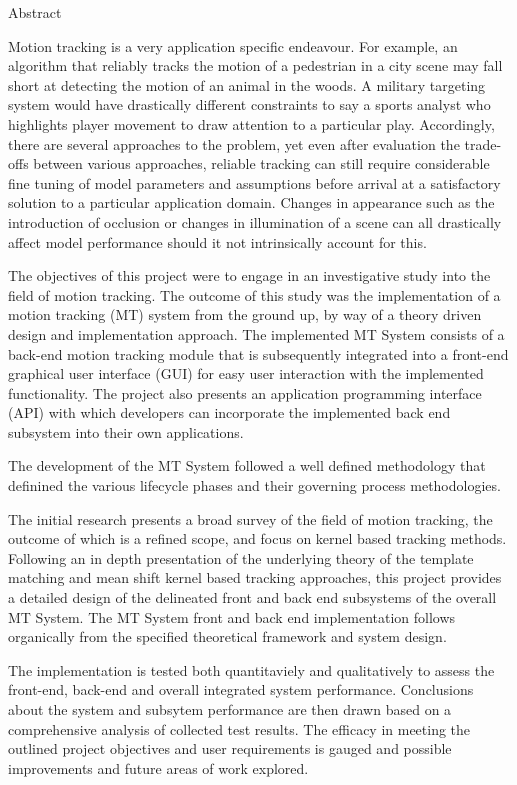 \begin{centerpage}{Abstract}
 
Motion tracking is a very application specific endeavour. For example, an
    algorithm that reliably tracks the motion of a pedestrian in a city scene may fall
    short at detecting the motion of an animal in the woods. A military targeting
    system would have drastically different constraints to say a sports analyst
    who highlights player movement to draw attention to a particular play.
    Accordingly, there are several approaches to the problem, yet even after evaluation
    the trade-offs between various approaches, reliable tracking can still require
    considerable fine tuning of model parameters and assumptions before arrival at a
    satisfactory solution to a particular application domain. 
    Changes in appearance such as the introduction of occlusion or changes in
    illumination of a scene can all drastically affect model performance should it
    not intrinsically account for this.

The objectives of this project were to engage in an investigative study into the field
    of motion tracking. The outcome of this study was the implementation of a
    motion tracking (MT) system from the ground up, by way of a theory driven design
    and implementation approach. The implemented MT System consists of a
    back-end motion tracking module that is subsequently integrated into a
    front-end graphical user interface (GUI) for easy user interaction with the
    implemented functionality.
    The project also presents an application programming interface (API) with
    which developers can incorporate the implemented back end subsystem into
    their own applications.

The development of the MT System followed a well defined methodology that
    definined the various lifecycle phases and their governing process
    methodologies. 
    
The initial research presents a broad survey of the field of motion tracking,
    the outcome of which is a refined scope, and focus on kernel based tracking
    methods. Following an in depth presentation of the underlying theory
    of the template matching and mean shift kernel based tracking approaches,
    this project provides a detailed design of the delineated front and back end
    subsystems of the overall MT System. The MT System front and back end
    implementation follows organically from the specified theoretical framework
    and system design. 
    
The implementation is tested both quantitaviely and qualitatively to assess the
    front-end, back-end and overall integrated system performance. 
    Conclusions about the system and subsytem performance are then drawn based on a
    comprehensive analysis of collected test results. The efficacy in meeting the
    outlined project objectives and user requirements is gauged and possible
    improvements and future areas of work explored.




\end{centerpage}
